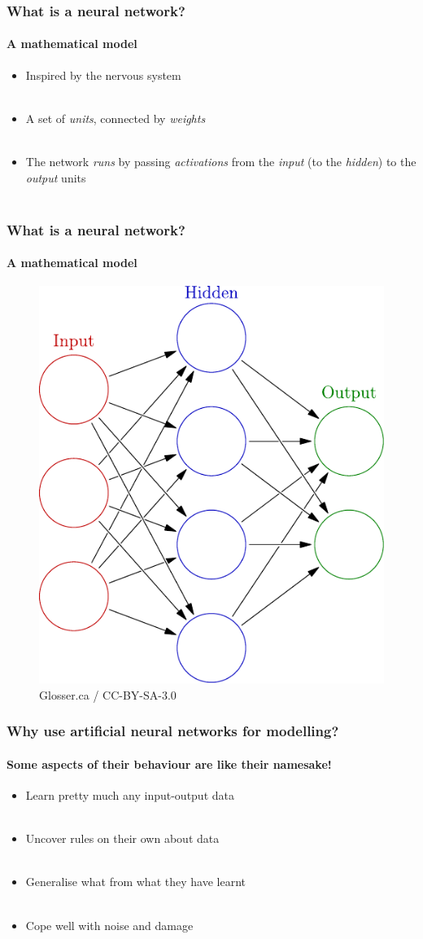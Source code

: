 \documentclass[mathserif]{beamer}
\begin{document}
\begin{frame}
\frametitle{What is a neural network?}
\framesubtitle{A mathematical model}
\begin{itemize}
\item Inspired by the nervous system \\ \
 \item A set of \emph{units}, connected by \emph{weights} \\ \
\item The network \emph{runs} by passing \emph{activations} from the \emph{input} (to the \emph{hidden}) to the \emph{output} units \\ \
\end{itemize}
\end{frame}
\begin{frame}
\frametitle{What is a neural network?}
\framesubtitle{A mathematical model}
\begin{figure}
 \centering
 \includegraphics[width=0.6\linewidth]{./fig/3-layer.pdf}
 \caption{Glosser.ca / CC-BY-SA-3.0}
\end{figure}
\end{frame}




\begin{frame}
\frametitle{Why use artificial neural networks for modelling?}
\framesubtitle{Some aspects of their behaviour are like their namesake!}
\begin{itemize}
\item Learn pretty much any input-output data \\ \
 \item Uncover rules on their own about data  \\ \
\item Generalise what from what they have learnt \\ \
\item Cope well with noise and damage \\ \
\end{itemize}
\end{frame}
\end{document}
